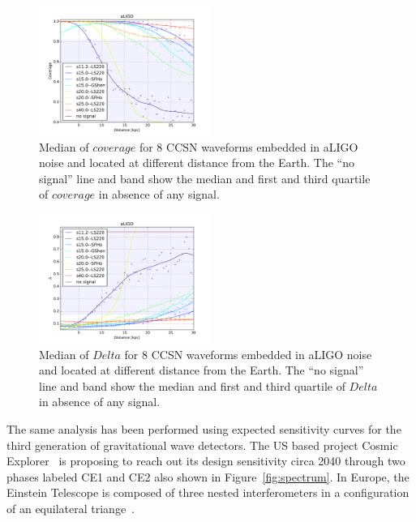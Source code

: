 \begin{figure}
  \centering
  \includegraphics[width=0.5\textwidth]{plots/aLIGO_coverage_allwvfs}
 \caption{Median of $coverage$ for 8 CCSN waveforms embedded in aLIGO noise and located at different distance from the Earth. The ``no signal'' line and band show the median and first and third quartile of $coverage$ in absence of any signal.} \label{fig:aLIGO_cov_allwvf}
\end{figure}

\begin{figure}
  \centering
  \includegraphics[width=0.5\textwidth]{plots/aLIGO_delta_allwvfs}
 \caption{Median of $Delta$ for 8 CCSN waveforms embedded in aLIGO noise and located at different distance from the Earth. The ``no signal'' line and band show the median and first and third quartile of $Delta$ in absence of any signal.} \label{fig:aLIGO_prec_allwvf}
\end{figure}

The same analysis has been performed using expected sensitivity curves for the third generation of
gravitational wave detectors. The US based project Cosmic Explorer~\cite{} is proposing to reach out
its design sensitivity circa 2040 through two phases labeled CE1 and CE2 also shown in
Figure~\ref{fig:spectrum}. In Europe, the Einstein Telescope is composed of three nested interferometers
in a configuration of an equilateral triange~\cite{}.



